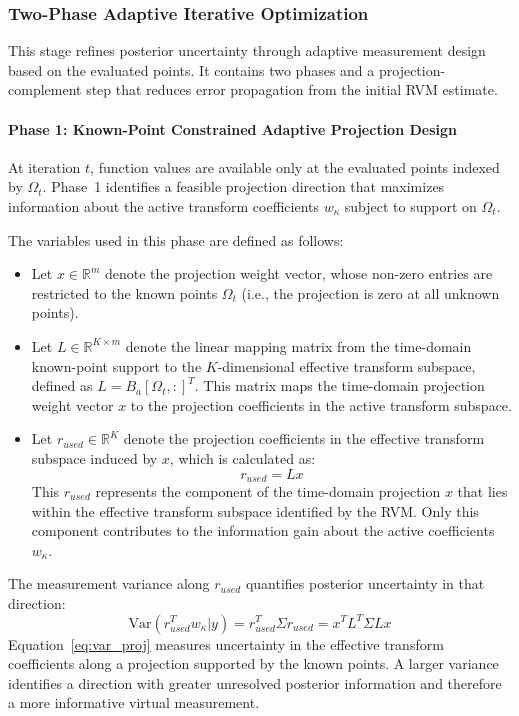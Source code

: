 \documentclass[lettersize,journal]{IEEEtran}
\begin{document}
\subsubsection{Two-Phase Adaptive Iterative Optimization}
This stage refines posterior uncertainty through adaptive measurement design based on the evaluated points. It contains two phases and a projection-complement step that reduces error propagation from the initial RVM estimate.

\paragraph{Phase 1: Known-Point Constrained Adaptive Projection Design}
At iteration $t$, function values are available only at the evaluated points indexed by $\Omega_t$. Phase~1 identifies a feasible projection direction that maximizes information about the active transform coefficients $w_\kappa$ subject to support on $\Omega_t$.

The variables used in this phase are defined as follows:
\begin{itemize}
    \item Let $x \in \mathbb{R}^m$ denote the projection weight vector, whose non-zero entries are restricted to the known points $\Omega_t$ (i.e., the projection is zero at all unknown points).
    \item Let $L \in \mathbb{R}^{K \times m}$ denote the linear mapping matrix from the time-domain known-point support to the $K$-dimensional effective transform subspace, defined as $L = B_a[\Omega_t, :]^T$. This matrix maps the time-domain projection weight vector $x$ to the projection coefficients in the active transform subspace.
    \item Let $r_{used} \in \mathbb{R}^K$ denote the projection coefficients in the effective transform subspace induced by $x$, which is calculated as:
    \begin{equation}
    r_{used} = L x
    \end{equation}
    This $r_{used}$ represents the component of the time-domain projection $x$ that lies within the effective transform subspace identified by the RVM. Only this component contributes to the information gain about the active coefficients $w_\kappa$.
\end{itemize}

The measurement variance along $r_{used}$ quantifies posterior uncertainty in that direction:
\begin{equation}
\text{Var}\left( r_{used}^T w_\kappa \big| y \right) = r_{used}^T \Sigma r_{used} = x^T L^T \Sigma L x
\label{eq:var_proj}
\end{equation}
Equation~\eqref{eq:var_proj} measures uncertainty in the effective transform coefficients along a projection supported by the known points. A larger variance identifies a direction with greater unresolved posterior information and therefore a more informative virtual measurement.
\end{document}
